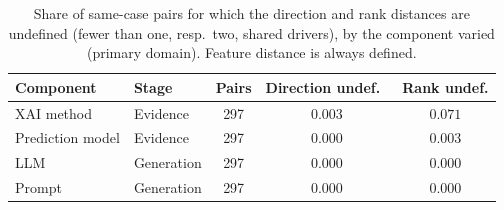 \begin{table}[t]
  \centering
  \caption{Share of same-case pairs for which the direction and rank distances
  are undefined (fewer than one, resp.\ two, shared drivers), by the component
  varied (primary domain). Feature distance is always defined.}
  \label{tab:coverage}
  \small
  \begin{tabular}{llccc}
    \toprule
    Component & Stage & Pairs & Direction undef.\ & Rank undef. \\
    \midrule
    XAI method & Evidence & 297 & $0.003$ & $0.071$ \\
    Prediction model & Evidence & 297 & $0.000$ & $0.003$ \\
    LLM & Generation & 297 & $0.000$ & $0.000$ \\
    Prompt & Generation & 297 & $0.000$ & $0.000$ \\
    \bottomrule
  \end{tabular}
\end{table}
